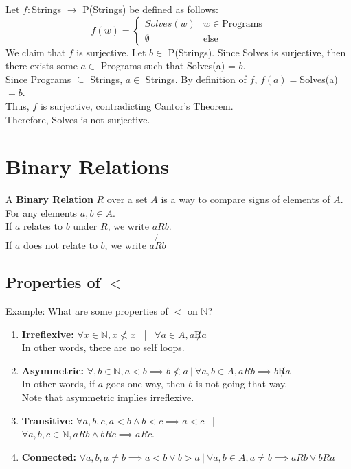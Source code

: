\documentclass{article}
\begin{document}
Let $f: $Strings $\rightarrow$ P(Strings) be defined as follows:
$$f(w) = \begin{cases}
Solves(w) & w \in \text{Programs}\\
\emptyset & \text{else}
\end{cases}$$
We claim that $f$ is surjective. Let $b \in$ P(Strings). Since Solves is surjective, then there exists some $a \in$ Programs such that Solves(a) = $b$.\\
Since Programs $\subseteq$ Strings, $a \in$ Strings. By definition of $f$, $f(a) = $Solves(a) $= b$.\\
Thus, $f$ is surjective, contradicting Cantor's Theorem.\\
Therefore, Solves is not surjective.
\\
\section{Binary Relations}
A \textbf{Binary Relation} $R$ over a set $A$ is a way to compare signs of elements of $A$. For any elements $a, b \in A$.\\
If $a$ relates to $b$ under $R$, we write $aRb$.\\
If $a$ does not relate to $b$, we write $a \not{R}b$
\subsection{Properties of $<$}
Example: What are some properties of $<$ on $\mathbb{N}$?\\
\begin{enumerate}
    \item \textbf{Irreflexive: } $\forall x \in \mathbb{N}, x \not < x$ \ | \ $\forall a \in A, a \not R a$\\
    In other words, there are no self loops.\\
    \item\textbf{Asymmetric: } $\forall,b \in \mathbb{N},a < b \implies b \not < a \ | \ \forall a,b \in A, aRb \implies b \not R a $\\
    In other words, if $a$ goes one way, then $b$ is not going that way.\\
    Note that asymmetric implies irreflexive.
    \item \textbf{Transitive: }$\forall a,b,c, a < b \land b < c \implies a < c$ \ | \ $\forall a,b, c \in \mathbb{N}, aRb \land bRc \implies aRc$. \\
    \item \textbf{Connected: } $\forall a,b, a\neq b \implies a < b \lor b > a \ | \ \forall a,b \in A, a \neq b \implies aRb \lor bRa$\\
\end{enumerate}
\end{document}
